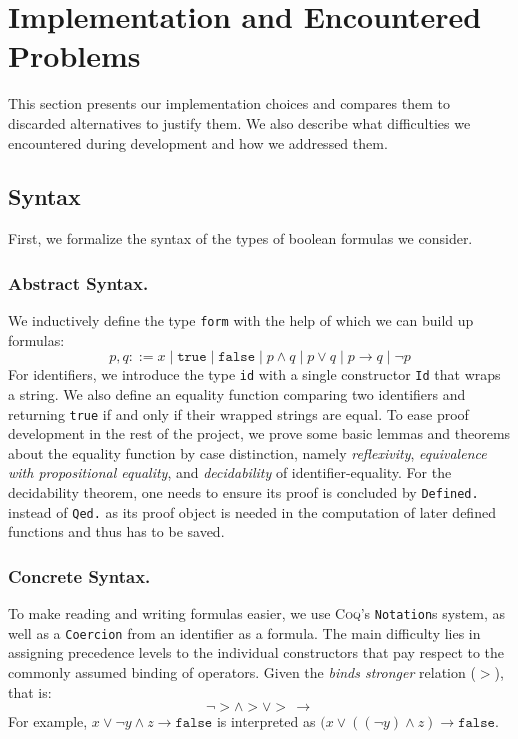 \section{Implementation and Encountered Problems}\label{sec:impl}

This section presents our implementation choices and compares them to discarded alternatives to justify them. 
We also describe what difficulties we encountered during development and how we addressed them.

\subsection{Syntax}

First, we formalize the syntax of the types of boolean formulas we consider. 

\subsubsection{Abstract Syntax.}

We inductively define the type \texttt{form} with the help of which we can build up formulas:
\begin{equation*}
    p, q ::= x\;|\;\texttt{true}\;|\;\texttt{false}\;|\;p \land q\;|\;p \lor q\;|\;p \rightarrow q\;|\;\neg p
\end{equation*}
For identifiers, we introduce the type \texttt{id} with a single constructor \texttt{Id} that wraps a string. 
We also define an equality function comparing two identifiers and returning \texttt{true} if and only if their wrapped strings are equal. 
To ease proof development in the rest of the project, we prove some basic lemmas and theorems about the equality function by case distinction, namely \emph{reflexivity}, \emph{equivalence with propositional equality}, and \emph{decidability} of identifier-equality.
For the decidability theorem, one needs to ensure its proof is concluded by \texttt{Defined.} instead of \texttt{Qed.} as its proof object is needed in the computation of later defined functions and thus has to be saved.

\subsubsection{Concrete Syntax.}

To make reading and writing formulas easier, we use \textsc{Coq}'s \texttt{Notation}s system, as well as a \texttt{Coercion} from an identifier as a formula. 
The main difficulty lies in assigning precedence levels to the individual constructors that pay respect to the commonly assumed binding of operators. 
Given the \emph{binds stronger} relation ($>$), that is:
\begin{equation*}
    \neg > \land > \lor >\,\rightarrow
\end{equation*}
For example, $x \lor \neg y \land z \rightarrow \texttt{false}$ is interpreted as $(x \lor ((\neg y) \land z) \rightarrow \texttt{false}$. 

